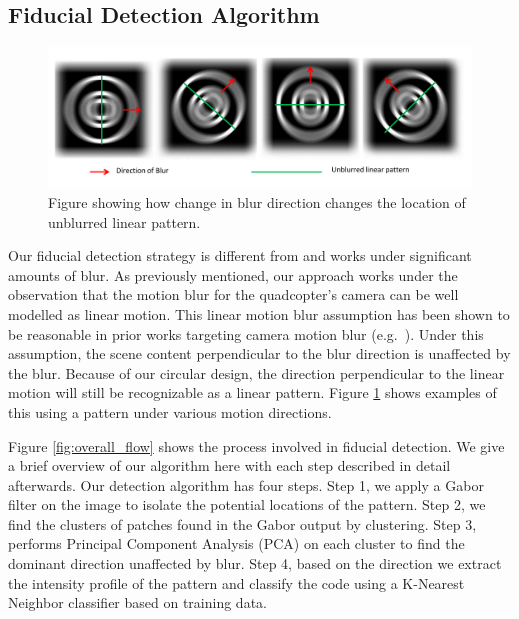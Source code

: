 \documentclass[10pt,twocolumn,letterpaper]{article}
\begin{document}
\subsection{Fiducial Detection Algorithm}

\begin{figure}
\centering
\includegraphics[width=\linewidth]{blur_direction.pdf}
\caption{Figure showing how change in blur direction changes the location of
unblurred linear pattern.}
\label{fig:blur_direction}
\end{figure}

Our fiducial detection strategy is different from \cite{NaimarkF02,Pitag13} and works
under significant amounts of blur.   As previously mentioned, our approach works
under the observation that the motion blur for the quadcopter's camera
can be well modelled as linear motion.  This  linear motion blur assumption has
been shown to be reasonable in prior works targeting camera motion blur
(e.g.~\cite{Moshe:2003,Moshe:2004}). Under this assumption, the scene content
perpendicular to the blur direction is unaffected by the blur.  Because of our
circular design, the direction perpendicular to the linear motion will still be
recognizable as a linear pattern.  Figure \ref{fig:blur_direction} shows
examples of this using a pattern under various motion directions.

Figure \ref{fig:overall_flow} shows the process involved in fiducial
detection. We give a brief overview of our algorithm here with each step described
in detail afterwards.  Our detection algorithm has four steps. Step 1,
we apply a Gabor filter on the image to isolate the
potential locations of the pattern.  Step 2, we find the clusters of patches
found in the Gabor output by clustering.  Step 3, performs Principal
Component Analysis (PCA) on each cluster to find the dominant direction
unaffected by blur.  Step 4, based on the direction we extract the intensity
profile of the pattern and classify the code using a K-Nearest Neighbor
classifier based on training data.
\end{document}
